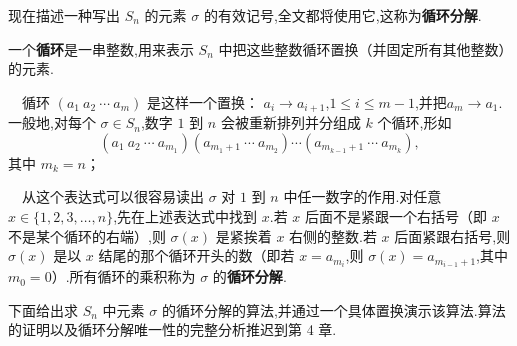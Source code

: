 现在描述一种写出 $S_n$ 的元素 $\sigma$ 的有效记号,全文都将使用它,这称为\textbf{循环分解}.

\begin{definition}
	一个\textbf{循环}是一串整数,用来表示 $S_n$ 中把这些整数循环置换（并固定所有其他整数）的元素.
	
	~~循环 $(a_1\ a_2\ \cdots\ a_m)$ 是这样一个置换： $a_i\to a_{i+1}$,$1\leq i\leq m-1$,并把$a_m\to a_1$.一般地,对每个 $\sigma\in S_n$,数字 $1$ 到 $n$ 会被重新排列并分组成 $k$ 个循环,形如
	\[
	(a_1\ a_2\ \cdots\ a_{m_1})
	(a_{m_1+1}\ \cdots\ a_{m_2})\cdots
	(a_{m_{k-1}+1}\ \cdots\ a_{m_k}),
	\]
	其中 $m_k=n$；
	
	~~从这个表达式可以很容易读出 $\sigma$ 对 $1$ 到 $n$ 中任一数字的作用.对任意 $x\in\{1,2,3,\ldots,n\}$,先在上述表达式中找到 $x$.若 $x$ 后面不是紧跟一个右括号（即 $x$ 不是某个循环的右端）,则 $\sigma(x)$ 是紧挨着 $x$ 右侧的整数.若 $x$ 后面紧跟右括号,则 $\sigma(x)$ 是以 $x$ 结尾的那个循环开头的数（即若 $x=a_{m_i}$,则 $\sigma(x)=a_{m_{i-1}+1}$,其中 $m_0=0$）.所有循环的乘积称为 $\sigma$ 的\textbf{循环分解}.
	
\end{definition}
下面给出求 $S_n$ 中元素 $\sigma$ 的循环分解的算法,并通过一个具体置换演示该算法.算法的证明以及循环分解唯一性的完整分析推迟到第 4 章.

